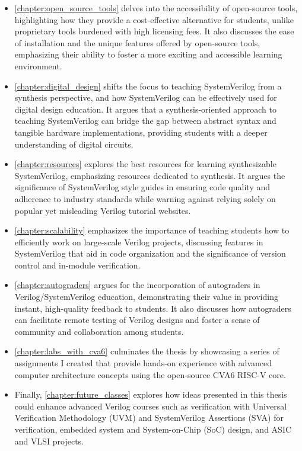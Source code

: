 \begin{itemize}

    \item \autoref{chapter:open_source_tools} delves into the accessibility of open-source tools, highlighting how they provide a cost-effective alternative for students, unlike proprietary tools burdened with high licensing fees. It also discusses the ease of installation and the unique features offered by open-source tools, emphasizing their ability to foster a more exciting and accessible learning environment.

    \item \autoref{chapter:digital_design} shifts the focus to teaching SystemVerilog from a synthesis perspective, and how SystemVerilog can be effectively used for digital design education. It argues that a synthesis-oriented approach to teaching SystemVerilog can bridge the gap between abstract syntax and tangible hardware implementations, providing students with a deeper understanding of digital circuits.

    \item \autoref{chapter:resources} explores the best resources for learning synthesizable SystemVerilog, emphasizing resources dedicated to synthesis. It argues the significance of SystemVerilog style guides in ensuring code quality and adherence to industry standards while warning against relying solely on popular yet misleading Verilog tutorial websites.

    \item \autoref{chapter:scalability} emphasizes the importance of teaching students how to efficiently work on large-scale Verilog projects, discussing features in SystemVerilog that aid in code organization and the significance of version control and in-module verification.

    \item \autoref{chapter:autograders} argues for the incorporation of autograders in Verilog/SystemVerilog education, demonstrating their value in providing instant, high-quality feedback to students. It also discusses how autograders can facilitate remote testing of Verilog designs and foster a sense of community and collaboration among students.

    \item \autoref{chapter:labs_with_cva6} culminates the thesis by showcasing a series of assignments I created that provide hands-on experience with advanced computer architecture concepts using the open-source CVA6 RISC-V core.

    \item Finally, \autoref{chapter:future_classes} explores how ideas presented in this thesis could enhance advanced Verilog courses such as verification with Universal Verification Methodology (UVM) and SystemVerilog Assertions (SVA) for verification, embedded system and System-on-Chip (SoC) design, and ASIC and VLSI projects.

\end{itemize}
